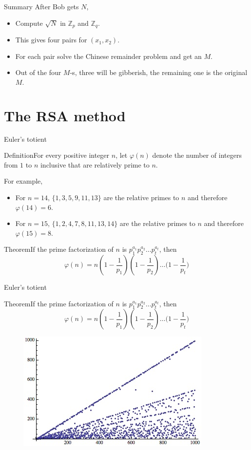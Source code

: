\documentclass{beamer}
\def\bl[#1]#2{\begin{block}{#1}#2\end{block}}
\def\itemb{\begin{itemize}}
\def\iteme{\end{itemize}}
\begin{document}
\begin{frame}{Summary}
After Bob gets $N$,
\itemb
\item Compute $\sqrt{N}$ in $\mathbb{Z}_p$ and $\mathbb{Z}_q$.
\item This gives four pairs for $(x_1,x_2)$.
\item For each pair solve the Chinese remainder problem and get an $M$. 
\item Out of the four $M$-s, three will be gibberish, the remaining one is the original $M$.
\iteme
\end{frame}


\section{The RSA method}
\begin{frame}{Euler's totient}
\bl[Definition]{For every positive integer $n$, let $\varphi(n)$ denote the number of integers from $1$ to $n$ inclusive that are relatively prime to $n$.}
For example,
\itemb
\item For $n=14$, $\{1,3,5,9,11,13\}$ are the relative primes to $n$ and therefore $\varphi(14)=6$.
\item For $n=15$, $\{1,2,4,7,8,11,13,14\}$ are the relative primes to $n$ and therefore $\varphi(15)=8$.
\iteme
\bl[Theorem]{If the prime factorization of $n$ is $p_1^{a_1}p_2^{a_2}\dots p_t^{a_t}$, then
\[
\varphi(n)=n\left(1-\frac{1}{p_1}\right)\left(1-\frac{1}{p_2}\right)\dots \bigg(1-\frac{1}{p_t}\bigg)
\]
}
\end{frame}


\begin{frame}{Euler's totient}
\bl[Theorem]{If the prime factorization of $n$ is $p_1^{a_1}p_2^{a_2}\dots p_t^{a_t}$, then
\[
\varphi(n)=n\left(1-\frac{1}{p_1}\right)\left(1-\frac{1}{p_2}\right)\dots \bigg(1-\frac{1}{p_t}\bigg)
\]
}
\begin{figure}
\centering
\includegraphics[scale=0.6]{Euler.jpg}
\end{figure}
\end{frame}
\end{document}
